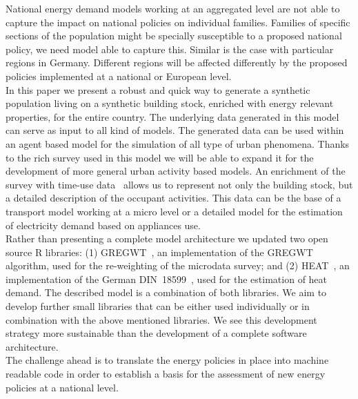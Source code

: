 \documentclass[runningheads,a4paper]{llncs}
\begin{document}
National energy demand models working at an aggregated level are not able to
capture the impact on national policies on individual families. Families of specific
sections of the population might be specially susceptible to a proposed
national policy, we need model able to capture this.
Similar is the case with particular regions in Germany.
Different regions will be affected differently by the proposed policies
implemented at a national or European level.
\\

In this paper we present a robust and quick way to generate a synthetic
population living on a synthetic building stock, enriched with energy relevant
properties, for the entire country. The underlying data generated in this model
can serve as input to all kind of models. The generated data can be used within
an agent based model for the simulation of all type of urban phenomena. Thanks
to the rich survey used in this model we will be able to expand it for the
development of more general urban activity based models. An enrichment of the
survey with time-use data~\cite{MunozH.2014.IBPSA-JP} allows us to represent
not only the building stock, but a detailed description of the occupant activities.
This data can be the base of a transport model working at a micro level or a
detailed model for the estimation of electricity demand based on appliances
use.
\\

Rather than presenting a complete model architecture we updated two open source
R libraries: (1) GREGWT~\cite{MunozH.2015.GREGWTR}, an implementation
of the GREGWT algorithm, used for the re-weighting of the microdata survey; and
(2) HEAT~\cite{MunozH.2015.heat}, an implementation of the German
DIN~18599~\cite{DIN.18599.V}, used for the estimation of heat demand.
The described model is a combination of both libraries.
We aim to develop further small libraries that can be either used individually or
in combination with the above mentioned libraries. We see this development strategy more
sustainable than the development of a complete software architecture.
\\

The challenge ahead is to translate the energy policies in place into machine
readable code in order to establish a basis for the assessment of new energy
policies at a national level.
\\



\end{document}
